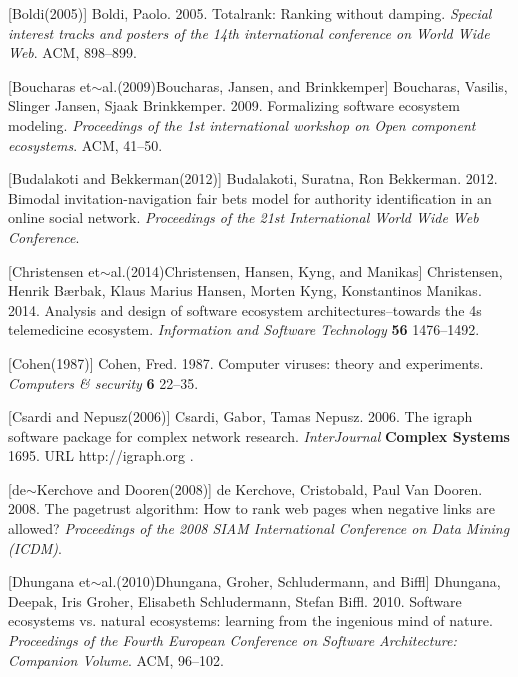 \documentclass{article} %
\begin{document}
\noindent 

[Boldi(2005)]  Boldi, Paolo. 2005.    Totalrank: Ranking without damping.    \textit{ Special interest tracks and posters of the 14th international conference on World Wide Web}. ACM, 898--899.

\noindent 

[Boucharas et$\sim$al.(2009)Boucharas, Jansen, and Brinkkemper]  Boucharas, Vasilis, Slinger Jansen, Sjaak Brinkkemper. 2009.    Formalizing software ecosystem modeling.    \textit{ Proceedings of the 1st international workshop on Open component ecosystems}. ACM, 41--50.

\noindent 

[Budalakoti and Bekkerman(2012)]  Budalakoti, Suratna, Ron Bekkerman. 2012.    Bimodal invitation-navigation fair bets model for authority identification in an online social network.    \textit{ Proceedings of the 21st International World Wide Web Conference}.

\noindent 

[Christensen et$\sim$al.(2014)Christensen, Hansen, Kyng, and Manikas]  Christensen, Henrik B{\ae}rbak, Klaus Marius Hansen, Morten Kyng, Konstantinos Manikas. 2014.    Analysis and design of software ecosystem architectures--towards the 4s telemedicine ecosystem.    \textit{ Information and Software Technology} \textbf{ 56} 1476--1492.

\noindent 

[Cohen(1987)]  Cohen, Fred. 1987.    Computer viruses: theory and experiments.    \textit{ Computers \& security} \textbf{ 6} 22--35.

\noindent 

[Csardi and Nepusz(2006)]  Csardi, Gabor, Tamas Nepusz. 2006.    The igraph software package for complex network research.    \textit{ InterJournal} \textbf{ Complex Systems} 1695.     URL   http://igraph.org .

\noindent 

[de$\sim$Kerchove and Dooren(2008)]  de Kerchove, Cristobald, Paul Van Dooren. 2008.    The pagetrust algorithm: How to rank web pages when negative links are allowed?    \textit{ Proceedings of the 2008 SIAM International Conference on Data Mining (ICDM)}.

\noindent 

[Dhungana et$\sim$al.(2010)Dhungana, Groher, Schludermann, and Biffl]  Dhungana, Deepak, Iris Groher, Elisabeth Schludermann, Stefan Biffl. 2010.    Software ecosystems vs. natural ecosystems: learning from the ingenious mind of nature.    \textit{ Proceedings of the Fourth European Conference on Software Architecture: Companion Volume}. ACM, 96--102.
\end{document}
